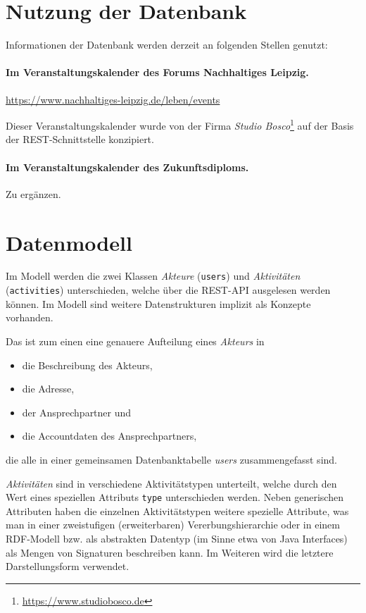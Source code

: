 \documentclass[a4paper,11pt]{article}
\begin{document}
\section{Nutzung der Datenbank}

Informationen der Datenbank werden derzeit an folgenden Stellen genutzt:

\paragraph{Im Veranstaltungskalender des Forums Nachhaltiges Leipzig.}
\begin{center}
  \url{https://www.nachhaltiges-leipzig.de/leben/events}
\end{center}
Dieser Veranstaltungskalender wurde von der Firma \emph{Studio
  Bosco}\footnote{\url{https://www.studiobosco.de}} auf der Basis der
REST-Schnittstelle konzipiert. 

\paragraph{Im Veranstaltungskalender des Zukunftsdiploms.}
Zu ergänzen.

\section{Datenmodell}

Im Modell werden die zwei Klassen \emph{Akteure} (\texttt{users}) und
\emph{Aktivitäten} (\texttt{activities}) unterschieden, welche über die
REST-API ausgelesen werden können.  Im Modell sind weitere Datenstrukturen
implizit als Konzepte vorhanden.

Das ist zum einen eine genauere Aufteilung eines \emph{Akteurs} in
\begin{itemize}\itemsep0pt
\item die Beschreibung des Akteurs,
\item die Adresse,
\item der Ansprechpartner und
\item die Accountdaten des Ansprechpartners,
\end{itemize}
die alle in einer gemeinsamen Datenbanktabelle \emph{users} zusammengefasst
sind.

\emph{Aktivitäten} sind in verschiedene Aktivitätstypen unterteilt, welche
durch den Wert eines speziellen Attributs \texttt{type} unterschieden werden.
Neben generischen Attributen haben die einzelnen Aktivitätstypen weitere
spezielle Attribute, was man in einer zweistufigen (erweiterbaren)
Vererbungshierarchie oder in einem RDF-Modell bzw. als abstrakten Datentyp (im
Sinne etwa von Java Interfaces) als Mengen von Signaturen beschreiben kann.
Im Weiteren wird die letztere Darstellungsform verwendet. 
\end{document}
